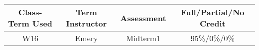 \begin{outcomes}
	\begin{center}
		\begin{tabular}{cccc}
			\hline\hline
			Class-Term Used & Term Instructor & Assessment & Full/Partial/No Credit \\
			\hline
			W16 & Emery & Midterm1 & 95\%/0\%/0\%\\    %
			\hline
		\end{tabular}
	\end{center}
\end{outcomes}

\begin{comments}
	
\end{comments}
